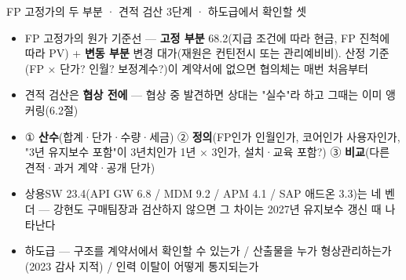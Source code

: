 \begin{frame}{FP 고정가의 두 부분 · 견적 검산 3단계 · 하도급에서 확인할 셋}
\begin{itemize}
\item FP 고정가의 원가 기준선 — \textbf{고정 부분} 68.2(지급 조건에 따라 현금, FP 진척에 따라 PV) + \textbf{변동 부분} 변경 대가(재원은 컨틴전시 또는 관리예비비). 산정 기준(FP × 단가? 인월? 보정계수?)이 계약서에 없으면 협의체는 매번 처음부터
\item 견적 검산은 \textbf{협상 전에} — 협상 중 발견하면 상대는 "실수"라 하고 그때는 이미 앵커링(6.2절)
\item ① \textbf{산수}(합계·단가·수량·세금) ② \textbf{정의}(FP인가 인월인가, 코어인가 사용자인가, "3년 유지보수 포함"이 3년치인가 1년 × 3인가, 설치·교육 포함?) ③ \textbf{비교}(다른 견적·과거 계약·공개 단가)
\item 상용SW 23.4(API GW 6.8 / MDM 9.2 / APM 4.1 / SAP 애드온 3.3)는 네 벤더 — 강현도 구매팀장과 검산하지 않으면 그 차이는 2027년 유지보수 갱신 때 나타난다
\item 하도급 — 구조를 계약서에서 확인할 수 있는가 / 산출물을 누가 형상관리하는가(2023 감사 지적) / 인력 이탈이 어떻게 통지되는가
\end{itemize}
\end{frame}

